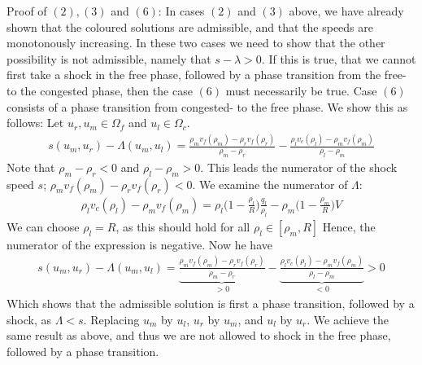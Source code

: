\documentclass[10pt]{article}
\numberwithin{equation}{section}
\begin{document}
Proof of $(2), (3)$ and $(6)$: \newline
In cases $(2)$ and $(3)$ above, we have already shown that the coloured solutions are admissible, and that the speeds are monotonously increasing. In these two cases we need to show that the other possibility is not admissible, namely that $s - \lambda > 0$. If this is true, that we cannot first take a shock in the free phase, followed by a phase transition from the free- to the congested phase, then the case $(6)$ must necessarily be true. Case $(6)$ consists of a phase transition from congested- to the free phase. We show this as follows: Let $u_r, u_m \in \Omega_f$ and $u_l \in \Omega_c$.
\begin{align*}
    s(u_m, u_r) - \Lambda(u_m, u_l) = \frac{\rho_m v_f(\rho_m) - \rho_r v_f(\rho_r)}{\rho_m - \rho_r} - \frac{\rho_l v_c(\rho_l) - \rho_m v_f(\rho_m)}{\rho_l - \rho_m}
\end{align*}
Note that $\rho_m - \rho_r < 0$ and $\rho_l - \rho_m > 0$. This leads the numerator of the shock speed $s$; $\rho_m v_f(\rho_m) - \rho_r v_f(\rho_r) < 0$.  We examine the numerator of $\Lambda:$
\begin{align*}
    \rho_l v_c(\rho_l) - \rho_m v_f(\rho_m) = \rho_l \bigg( 1 - \frac{\rho_l}{R}\bigg) \frac{q_l}{\rho_l} - \rho_m \bigg( 1- \frac{\rho_m}{R}\bigg)V
\end{align*}
We can choose $\rho_l = R$, as this should hold for all $\rho_l \in [ \rho_m, R]$ Hence, the numerator of the expression is negative.  Now he have
\begin{align*}
    s(u_m, u_r) - \Lambda(u_m, u_l) = \underbrace{ \frac{\rho_m v_f(\rho_m) - \rho_r v_f(\rho_r)}{\rho_m - \rho_r}}_{ > 0} - \underbrace{\frac{\rho_l v_c(\rho_l) - \rho_m v_f(\rho_m)}{\rho_l - \rho_m}}_{< 0} > 0
\end{align*}
Which shows that the admissible solution is first a phase transition, followed by a shock, as $\Lambda < s$. Replacing $u_m$ by $u_l$, $u_r$ by $u_m$, and $u_l$ by $u_r$. We achieve the same result as above, and thus we are not allowed to shock in the free phase, followed by a phase transition. 
\end{document}
